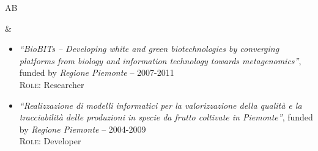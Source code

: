 \documentclass[a4paper,10pt]{article}
\newenvironment{doubletablelist}
{
	\vspace{-0.2cm}
	\begin{longtable}[!h]{AB}}{\end{longtable}
}
\newcommand{\dtlist}[2]{
\hspace{-3cm}
\noindent
	\begin{minipage}{0.24\textwidth}
	\begin{flushright}
	\textsc{#1}
	\end{flushright}
	\end{minipage}
	& #2\\[0.2cm]
}
\newcommand{\minusitem}{\item[-]}
\begin{document}
\begin{doubletablelist}
\dtlist{}{
	\vspace{-0.8cm}
	\begin{itemize} %
	
		\minusitem   \begin{minipage}{0.65\textwidth}
			\emph{``BioBITs -- Developing white and green biotechnologies by converging platforms from biology and information technology towards metagenomics''}, funded by \emph{Regione Piemonte} -- 2007-2011\\
			\textsc{Role:} Researcher
		\end{minipage}
		
		\minusitem  \begin{minipage}{0.65\textwidth}
			\emph{``Realizzazione di modelli informatici per la valorizzazione della qualit\`a e la tracciabilit\`a delle produzioni in specie da frutto coltivate in Piemonte''}, funded by \emph{Regione Piemonte} -- 2004-2009\\
			\textsc{Role:} Developer
		\end{minipage}		
	\end{itemize}
}





\end{doubletablelist}
\end{document}
